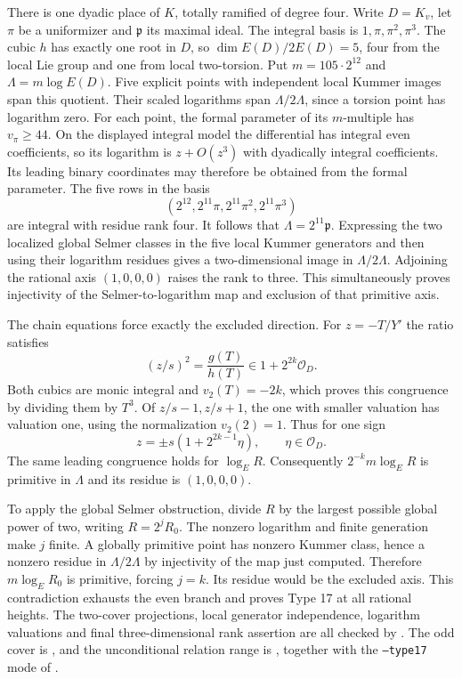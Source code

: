 There is one dyadic place of $K$, totally ramified of degree four.
Write $D=K_v$, let $\pi$ be a uniformizer and $\mathfrak p$ its
maximal ideal. The integral basis is $1,\pi,\pi^2,\pi^3$.
The cubic $h$ has exactly one root in $D$, so
$\dim E(D)/2E(D)=5$, four from the local Lie group and one from
local two-torsion. Put $m=105\cdot2^{12}$ and
$\Lambda=m\log E(D)$. Five explicit points with independent local
Kummer images span this quotient. Their scaled logarithms span
$\Lambda/2\Lambda$, since a torsion point has logarithm zero.
For each point, the formal parameter of its $m$-multiple has
$v_\pi\geq44$. On the displayed integral model the differential
has integral even coefficients, so its logarithm is
$z+O(z^3)$ with dyadically integral coefficients. Its leading binary
coordinates may therefore be obtained from the formal parameter.
The five rows in the basis
\[
 (2^{12},2^{11}\pi,2^{11}\pi^2,2^{11}\pi^3)
\]
are integral with residue rank four. It follows that
$\Lambda=2^{11}\mathfrak p$. Expressing the two localized global
Selmer classes in the five local Kummer generators and then using
their logarithm residues gives a two-dimensional image in
$\Lambda/2\Lambda$. Adjoining the rational axis $(1,0,0,0)$
raises the rank to three. This simultaneously proves injectivity
of the Selmer-to-logarithm map and exclusion of that primitive
axis.

The chain equations force exactly the excluded direction. For
$z=-T/Y'$ the ratio satisfies
\[
 (z/s)^2=\frac{g(T)}{h(T)}\in1+2^{2k}\mathcal O_D.
\]
Both cubics are monic integral and $v_2(T)=-2k$, which proves this
congruence by dividing them by $T^3$. Of $z/s-1,z/s+1$, the one
with smaller valuation has valuation one, using the normalization
$v_2(2)=1$. Thus for one sign
\[
 z=\pm s(1+2^{2k-1}\eta),\qquad\eta\in\mathcal O_D.
\]
The same leading congruence holds for $\log_E R$. Consequently
$2^{-k}m\log_E R$ is primitive in $\Lambda$ and its residue is
$(1,0,0,0)$.

To apply the global Selmer obstruction, divide $R$ by the largest
possible global power of two, writing $R=2^jR_0$. The nonzero
logarithm and finite generation make $j$ finite. A globally
primitive point has nonzero Kummer class, hence a nonzero residue
in $\Lambda/2\Lambda$ by injectivity of the map just computed.
Therefore $m\log_E R_0$ is primitive, forcing $j=k$.
Its residue would be the excluded axis. This contradiction
exhausts the even branch and proves Type 17 at all rational
heights. The two-cover projections, local generator independence,
logarithm valuations and final three-dimensional rank assertion
are all checked by .
The odd cover is , and the
unconditional relation range is
, together with the
\texttt{--type17} mode of
.
